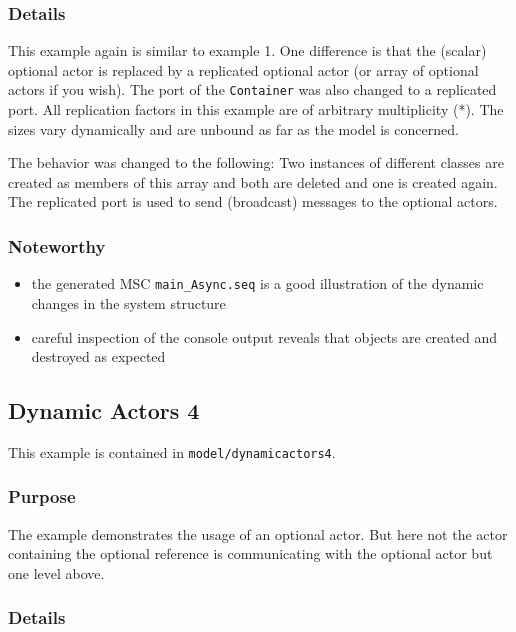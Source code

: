 \subsubsection{Details}

This example again is similar to example 1. One difference is that the (scalar) optional actor is replaced by a
replicated optional actor (or array of optional actors if you wish).
The port of the \texttt{Container} was also changed to a replicated port. All replication factors in this example
are of arbitrary multiplicity (*). The sizes vary dynamically and are unbound as far as the model is concerned.

The behavior was changed to the following:
Two instances of different classes are created as members of this array and both are deleted and one is created again.
The replicated port is used to send (broadcast) messages to the optional actors.

\subsubsection{Noteworthy}

\begin{itemize}
\item the generated MSC \texttt{main\_Async.seq} is a good illustration of the dynamic changes in the system structure
\item careful inspection of the console output reveals that objects are created and destroyed as expected
\end{itemize}

\subsection{Dynamic Actors 4}

This example is contained in \texttt{model/dynamicactors4}.

\subsubsection{Purpose}

The example demonstrates the usage of an optional actor. But here not the actor containing the optional reference
is communicating with the optional actor but one level above.

\subsubsection{Details}

